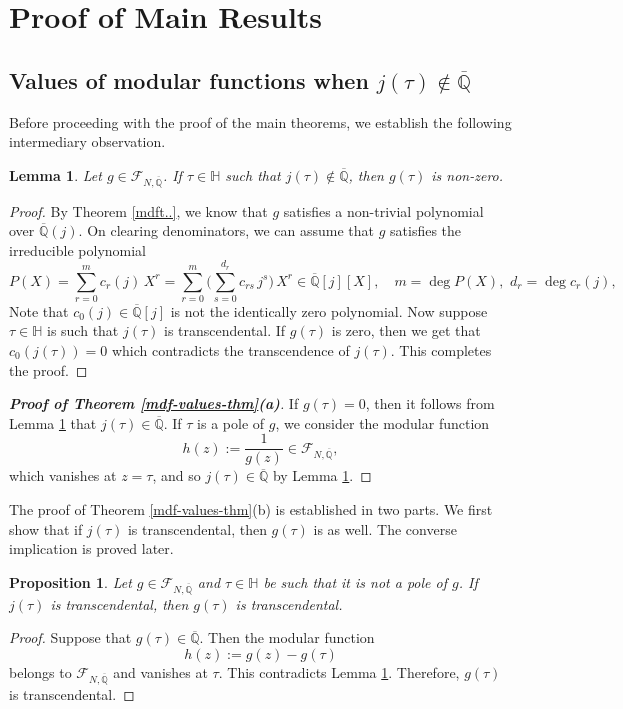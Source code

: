 \documentclass[11pt, reqno]{amsart}
\newtheorem{lemma}[theorem]{Lemma}
\newtheorem{prop}[theorem]{Proposition}
\begin{document}
\bigskip

\section{\bf Proof of Main Results}
\bigskip

\subsection{Values of modular functions when $j(\tau) \not\in \overline{\mathbb{Q}}$}
Before proceeding with the proof of the main theorems, we establish the following intermediary observation.
\begin{lemma} \label{mdfz}
    Let $g\in  \mathcal{F}_{N,\overline{\mathbb{Q}}}$. If $\tau\in \mathbb{H}$ such that $j(\tau)\notin\overline{\mathbb{Q}}$, then $g(\tau)$ is non-zero.
\end{lemma}
\begin{proof}
By Theorem \ref{mdft..}, we know that $g$ satisfies a non-trivial polynomial over $\overline{\mathbb{Q}}(j)$. On clearing denominators, we can assume that $g$ satisfies the irreducible polynomial
$$
P(X)= \sum_{r=0}^m c_r(j) \, X^r =\sum_{r=0}^m \bigg( \sum_{s=0}^{d_r}c_{r s}\,j^s \bigg) \,X^r \in \overline{\mathbb{Q}}[j][X], \quad m=\deg P(X), \, \, d_r=\deg c_r(j),
$$
Note that $c_0(j) \in \overline{\mathbb{Q}}[j]$ is not the identically zero polynomial. Now suppose $\tau \in \mathbb{H}$ is such that $j(\tau)$ is transcendental. If $g(\tau)$ is zero, then we get that $c_0(j(\tau))=0$ which contradicts the transcendence of $j(\tau)$. This completes the proof. 
\end{proof}

\begin{proof}[\bf Proof of Theorem \ref{mdf-values-thm}(a)]
If $g(\tau)=0$, then it follows from Lemma \ref{mdfz} that $j(\tau)\in \overline{\mathbb{Q}}$. If $\tau$ is a pole of $g$, we consider the modular function
$$
h(z):=\frac{1}{g(z)}\in \mathcal{F}_{N,\overline{\mathbb{Q}}},
$$
which vanishes at $z=\tau$, and so $j(\tau)\in\overline{\mathbb{Q}}$ by Lemma \ref{mdfz}.    
\end{proof}

The proof of Theorem \ref{mdf-values-thm}(b) is established in two parts. We first show that if $j(\tau)$ is transcendental, then $g(\tau)$ is as well. The converse implication is proved later.
\begin{prop}\label{tranmf}
 Let $g\in \mathcal{F}_{N,\overline{\mathbb{Q}}}$ and $\tau\in \mathbb{H}$ be such that it is not a pole of $g$. If $j(\tau)$ is transcendental, then $g(\tau)$ is transcendental.
\end{prop}
\begin{proof}
Suppose that $g(\tau)\in\overline{\mathbb{Q}}$. Then the modular function $$h(z):=g(z)-g(\tau)$$ belongs to $ \mathcal{F}_{N,\overline{\mathbb{Q}}}$ and vanishes at $\tau$. This contradicts Lemma \ref{mdfz}. Therefore, $g(\tau)$ is transcendental.
\end{proof}
\end{document}
